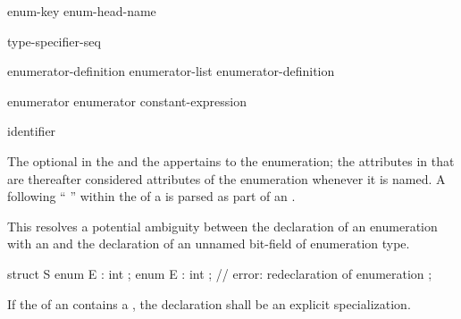 \begin{bnf}
\br
    enum-key  enum-head-name  \terminal{;}
\end{bnf}

\begin{bnf}
\br
    \br
     \br
     
\end{bnf}

\begin{bnf}
\br
    \terminal{:} type-specifier-seq
\end{bnf}

\begin{bnf}
\br
    enumerator-definition\br
    enumerator-list \terminal{,} enumerator-definition
\end{bnf}

\begin{bnf}
\br
    enumerator\br
    enumerator \terminal{=} constant-expression
\end{bnf}

\begin{bnf}
\br
    identifier 
\end{bnf}

The optional  in the  and
the  appertains to the enumeration; the attributes
in that  are thereafter considered attributes of the
enumeration whenever it is named.
A \tcode{:} following
``  ''
within the  of a 
is parsed as part of an .
\begin{note}
This resolves a potential ambiguity between the declaration of an enumeration
with an  and the declaration of an unnamed bit-field of enumeration
type.
\begin{example}
\begin{codeblock}
struct S {
  enum E : int {};
  enum E : int {};              // error: redeclaration of enumeration
};
\end{codeblock}

\end{example}
\end{note}
If the  of an  contains
a ,
the declaration shall be an explicit specialization.

